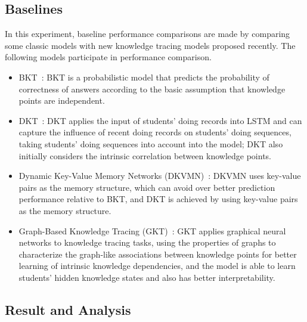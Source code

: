 \subsection{Baselines}
In this experiment, baseline performance comparisons are made by comparing some classic models with new knowledge tracing models proposed recently. The following models participate in performance comparison.
\begin{itemize}
	\item BKT~\cite{yudelson2013individualized}: BKT is a probabilistic model that predicts the probability of correctness of answers according to the basic assumption that knowledge points are independent.
	\item DKT~\cite{piech2015deep}: DKT applies the input of students' doing records into LSTM and can capture the influence of recent doing records on students' doing sequences, taking students' doing sequences into account into the model; DKT also initially considers the intrinsic correlation between knowledge points.
	\item Dynamic Key-Value Memory Networks (DKVMN)~\cite{zhang2017dynamic}: DKVMN uses key-value pairs as the memory structure, which can avoid over better prediction performance relative to BKT, and DKT is achieved by using key-value pairs as the memory structure.
	\item Graph-Based Knowledge Tracing (GKT)~\cite{nakagawa2019graph}: GKT applies graphical neural networks to knowledge tracing tasks, using the properties of graphs to characterize the graph-like associations between knowledge points for better learning of intrinsic knowledge dependencies, and the model is able to learn students' hidden knowledge states and also has better interpretability.
\end{itemize}

\subsection{Result and Analysis}

